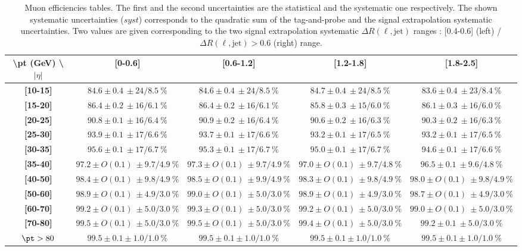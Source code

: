 \begin{table}[htb!]
	\begin{center} {\scriptsize
\begin{tabular}{|c|c|c|c|c|}
\hline 
\textbf{\textbackslash{}pt (GeV) \textbackslash{} $|\eta|$} & \textbf{{[}0-0.6{]}} & \textbf{{[}0.6-1.2{]}} & \textbf{{[}1.2-1.8{]}} & \textbf{{[}1.8-2.5{]}}\tabularnewline
\hline 
\hline 
\textbf{{[}10-15{]}} & $84.6\pm0.4~\pm24/8.5~\%$ & $84.6\pm0.4~\pm24/8.5~\%$ & $84.7\pm0.4~\pm24/8.5~\%$ & $83.6\pm0.4~\pm23/8.4~\%$\tabularnewline
\hline 
\textbf{{[}15-20{]}} & $86.4\pm0.2~\pm16/6.1~\%$ & $86.4\pm0.2~\pm16/6.1~\%$ & $85.8\pm0.3~\pm15/6.0~\%$ & $86.1\pm0.3~\pm16/6.0~\%$\tabularnewline
\hline 
\textbf{{[}20-25{]}} & $90.8\pm0.1~\pm16/6.4~\%$ & $90.9\pm0.2~\pm16/6.4~\%$ & $90.6\pm0.2~\pm16/6.3~\%$ & $90.3\pm0.2~\pm16/6.3~\%$\tabularnewline
\hline 
\textbf{{[}25-30{]}} & $93.9\pm0.1~\pm17/6.6~\%$ & $93.7\pm0.1~\pm17/6.6~\%$ & $93.2\pm0.1~\pm17/6.5~\%$ & $93.2\pm0.1~\pm17/6.5~\%$\tabularnewline
\hline 
\textbf{{[}30-35{]}} & $95.6\pm0.1~\pm17/6.7~\%$ & $95.3\pm0.1~\pm17/6.7~\%$ & $95.0\pm0.1~\pm17/6.7~\%$ & $94.6\pm0.1~\pm17/6.6~\%$\tabularnewline
\hline 
\textbf{{[}35-40{]}} & $97.2\pm O(0.1)~\pm9.7/4.9~\%$ & $97.3\pm O(0.1)~\pm9.7/4.9~\%$ & $97.0\pm O(0.1)~\pm9.7/4.8~\%$ & $96.5\pm0.1~\pm9.6/4.8~\%$\tabularnewline
\hline 
\textbf{{[}40-50{]}} & $98.4\pm O(0.1)~\pm9.8/4.9~\%$ & $98.5\pm O(0.1)~\pm9.9/4.9~\%$ & $98.3\pm O(0.1)~\pm9.8/4.9~\%$ & $98.0\pm O(0.1)~\pm9.8/4.9~\%$\tabularnewline
\hline 
\textbf{{[}50-60{]}} & $98.9\pm O(0.1)~\pm4.9/3.0~\%$ & $99.0\pm O(0.1)~\pm5.0/3.0~\%$ & $98.9\pm O(0.1)~\pm4.9/3.0~\%$ & $98.7\pm O(0.1)~\pm4.9/3.0~\%$\tabularnewline
\hline 
\textbf{{[}60-70{]}} & $99.2\pm O(0.1)~\pm5.0/3.0~\%$ & $99.3\pm O(0.1)~\pm5.0/3.0~\%$ & $99.2\pm O(0.1)~\pm5.0/3.0~\%$ & $99.0\pm O(0.1)~\pm5.0/3.0~\%$\tabularnewline
\hline 
\textbf{{[}70-80{]}} & $99.5\pm O(0.1)~\pm5.0/3.0~\%$ & $99.5\pm O(0.1)~\pm5.0/3.0~\%$ & $99.4\pm O(0.1)~\pm5.0/3.0~\%$ & $99.2\pm0.1~\pm5.0/3.0~\%$\tabularnewline
\hline 
$\pt>80$ & $99.5\pm0.1\pm1.0/1.0~\%$ & $99.5\pm0.1\pm1.0/1.0~\%$ & $99.5\pm0.1\pm1.0/1.0~\%$ & $99.5\pm0.1\pm1.0/1.0~\%$\tabularnewline
\hline 
\end{tabular}}
	\caption{ \label{tab:Real_Eff_muons} Muon efficiencies tables. The first and the second uncertainties are the statistical and the systematic one respectively. The shown systematic uncertainties ($syst$) corresponds to the quadratic sum of the tag-and-probe and the signal extrapolation systematic uncertainties. Two values are given corresponding to the two signal extrapolation systematic  $\Delta R(\ell,\mathrm{jet})$ ranges : [0.4-0.6] (left) / $\Delta R(\ell,\mathrm{jet}) > 0.6$ (right) range.}
        \end{center}
\end{table}


